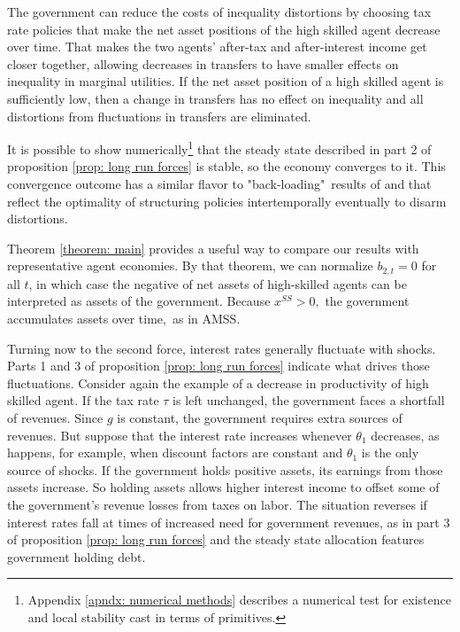 \documentclass[thmsb,11pt]{article}
\begin{document}
{The government can reduce the costs of  inequality distortions by choosing
tax rate policies that make the net asset positions of  the high skilled agent
decrease over time. That makes the two agents'
after-tax and after-interest income  get closer
together, allowing decreases in transfers to have smaller effects on inequality in
marginal utilities. If the net asset position of a high skilled agent is
sufficiently low, then a change in transfers has no effect on inequality and
all  distortions from fluctuations in transfers are eliminated.

It is possible to show numerically\footnote{Appendix \ref{apndx: numerical methods} describes a numerical test for existence and local stability cast in terms of  primitives.} that the steady state described in part
2 of  proposition \ref{prop: long run forces} is stable, so the  economy converges to it. This convergence outcome has
a similar flavor to "back-loading"\ results  of
\cite{Ray2002} and \cite{Albanesi2012} that reflect the  optimality of structuring policies intertemporally eventually to disarm  distortions.

Theorem \ref{theorem: main} provides  a useful way to compare our results with
 representative agent economies. By that theorem, we can normalize $%
b_{2,t}=0 $ for all $t$, in which case the negative of net assets of high-skilled agents can be
interpreted as assets of the government. Because $x^{SS}>0,$
the government  accumulates assets over time$,$ as in  AMSS.

Turning now to the second force,  interest rates generally fluctuate
with  shocks.  Parts 1 and 3 of  proposition \ref{prop: long run forces} indicate what drives those  fluctuations. Consider again the example of a
decrease in productivity of high skilled agent. If the  tax rate  $\tau $ is left unchanged,
the government faces a shortfall of revenues. Since
$g$ is constant, the
government requires  extra sources of revenues. But  suppose that
the interest rate increases whenever $\theta_1 $ decreases, as happens, for
example, when  discount factors are
constant and $\theta_1 $ is the only source of shocks. If the government holds positive assets, its earnings from those assets increase.
 So holding assets allows higher interest income
 to offset some of the government's revenue losses from taxes on labor.  The situation reverses if interest rates fall at
times of increased need for government revenues, as in
 part 3 of  proposition \ref{prop: long run forces} and the steady state allocation features government holding debt.

}
\end{document}
